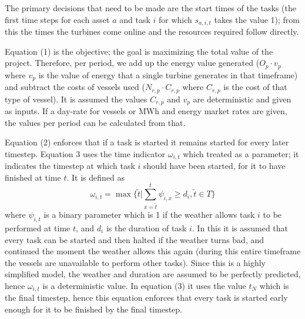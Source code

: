 \documentclass[a4paper,12pt]{article}
\begin{document}
The primary decisions that need to be made are the start times of the tasks (the first time steps for each asset $a$ and task $i$ for which $s_{a,i,t}$ takes the value 1); from this the times the turbines come online and the resources required follow directly. 

Equation (1) is the objective; the goal is maximizing the total value of the project. Therefore, per period, we add up the energy value generated ($O_p \cdot v_p$ where $v_p$ is the value of energy that a single turbine generates in that timeframe) and subtract the costs of vessels used ($N_{r,p} \cdot C_{r,p}$ where $C_{r,p}$ is the cost of that type of vessel). It is assumed the values $C_{r,p}$ and $v_p$ are deterministic and given as inputs. If a day-rate for vessels or MWh and energy market rates are given, the values per period can be calculated from that. 

Equation (2) enforces that if a task is started it remains started for every later timestep. Equation 3 uses the time indicator $\omega_{i,t}$ which treated as a parameter; it indicates the timestep at which task $i$ should have been started, for it to have finished at time $t$. It is defined as 
$$\omega_{i,t} = \max\{\tilde{t} | \sum_{x = \tilde{t}}^t \psi_{i,x} \geq d_i, \tilde{t} \in T\}$$ 
where $\psi_{i,t}$ is a binary parameter which is 1 if the weather allows task $i$ to be performed at time $t$, and $d_i$ is the duration of task $i$. In this it is assumed that every task can be started and then halted if the weather turns bad, and continued the moment the weather allows this again (during this entire timeframe the vessels are unavailable to perform other tasks). Since this is a highly simplified model, the weather and duration are assumed to be perfectly predicted, hence $\omega_{i,t}$ is a deterministic value. In equation (3) it uses the value $t_N$ which is the final timestep, hence this equation enforces that every task is started early enough for it to be finished by the final timestep. 
\end{document}
